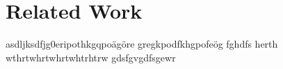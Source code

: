 \section{Related Work} \label{subsection:introduction-related}
asdljksdfjg0eripothkgqpoägöre
gregkpodfkhgpofeög
fghdfs
herth
wthrtwhrtwhrtwhtrhtrw
gdsfgvgdfsgewr
